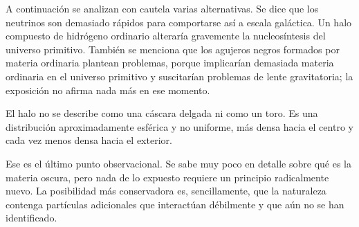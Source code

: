 A continuación se analizan con cautela varias alternativas. Se dice que los neutrinos son demasiado rápidos para comportarse así a escala galáctica. Un halo compuesto de hidrógeno ordinario alteraría gravemente la nucleosíntesis del universo primitivo. También se menciona que los agujeros negros formados por materia ordinaria plantean problemas, porque implicarían demasiada materia ordinaria en el universo primitivo y suscitarían problemas de lente gravitatoria; la exposición no afirma nada más en ese momento.

El halo no se describe como una cáscara delgada ni como un toro. Es una distribución aproximadamente esférica y no uniforme, más densa hacia el centro y cada vez menos densa hacia el exterior.

\begin{classroomqa}
\end{classroomqa}

Ese es el último punto observacional. Se sabe muy poco en detalle sobre qué es la materia oscura, pero nada de lo expuesto requiere un principio radicalmente nuevo. La posibilidad más conservadora es, sencillamente, que la naturaleza contenga partículas adicionales que interactúan débilmente y que aún no se han identificado.

